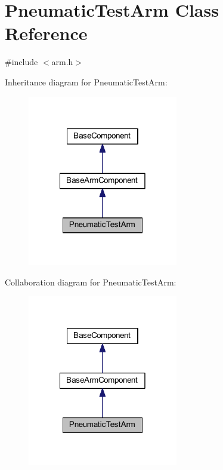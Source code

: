 \hypertarget{class_pneumatic_test_arm}{\section{\-Pneumatic\-Test\-Arm \-Class \-Reference}
\label{class_pneumatic_test_arm}
}


{\ttfamily \#include $<$arm.\-h$>$}



\-Inheritance diagram for \-Pneumatic\-Test\-Arm\-:\nopagebreak
\begin{figure}[H]
\begin{center}
\leavevmode
\includegraphics[width=186pt]{class_pneumatic_test_arm__inherit__graph}
\end{center}
\end{figure}


\-Collaboration diagram for \-Pneumatic\-Test\-Arm\-:\nopagebreak
\begin{figure}[H]
\begin{center}
\leavevmode
\includegraphics[width=186pt]{class_pneumatic_test_arm__coll__graph}
\end{center}
\end{figure}
